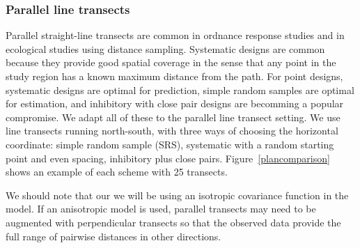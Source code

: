 \documentclass[review]{elsarticle}
\begin{document}
\subsubsection{Parallel line transects}

Parallel straight-line transects are common in ordnance response studies and in
ecological studies using distance sampling. Systematic designs are common
because they provide good spatial coverage in the sense that any point in the
study region has a known maximum distance from the path. For point designs,
systematic designs are optimal for prediction, simple random samples are
optimal for estimation, and inhibitory with close pair designs are becomming a
popular compromise. We adapt all of these to the parallel line transect
setting. We use line transects running north-south, with three ways of choosing
the horizontal coordinate: simple random sample (SRS), systematic with a random
starting point and even spacing, inhibitory plus close pairs.
Figure~\ref{plancomparison} shows an example of each scheme with 25 transects.

We should note that our we will be using an isotropic covariance function in
the model. If an anisotropic model is used, parallel transects may need to be
augmented with perpendicular transects so that the observed data provide the
full range of pairwise distances in other directions.
\end{document}
